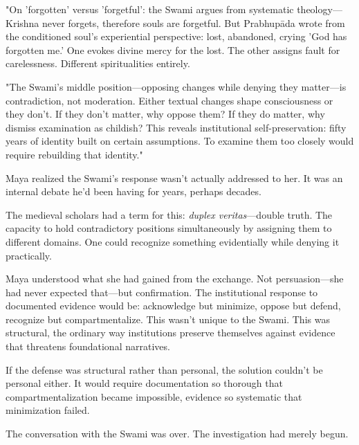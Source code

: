 \documentclass[12pt]{article}
\begin{document}
"On 'forgotten' versus 'forgetful': the Swami argues from systematic theology—Krishna never forgets, therefore souls are forgetful. But Prabhupāda wrote from the conditioned soul's experiential perspective: lost, abandoned, crying 'God has forgotten me.' One evokes divine mercy for the lost. The other assigns fault for carelessness. Different spiritualities entirely.

"The Swami's middle position—opposing changes while denying they matter—is contradiction, not moderation. Either textual changes shape consciousness or they don't. If they don't matter, why oppose them? If they do matter, why dismiss examination as childish? This reveals institutional self-preservation: fifty years of identity built on certain assumptions. To examine them too closely would require rebuilding that identity."

Maya realized the Swami's response wasn't actually addressed to her. It was an internal debate he'd been having for years, perhaps decades.

The medieval scholars had a term for this: \textit{duplex veritas}—double truth. The capacity to hold contradictory positions simultaneously by assigning them to different domains. One could recognize something evidentially while denying it practically.

Maya understood what she had gained from the exchange. Not persuasion—she had never expected that—but confirmation. The institutional response to documented evidence would be: acknowledge but minimize, oppose but defend, recognize but compartmentalize. This wasn't unique to the Swami. This was structural, the ordinary way institutions preserve themselves against evidence that threatens foundational narratives.

If the defense was structural rather than personal, the solution couldn't be personal either. It would require documentation so thorough that compartmentalization became impossible, evidence so systematic that minimization failed.

The conversation with the Swami was over. The investigation had merely begun.
\end{document}
